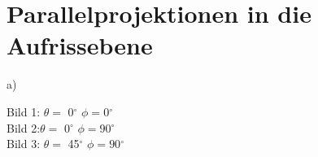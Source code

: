 
\setcounter{T-section}{2}
\renewcommand*\thesection{T\Nummerierung{\arabic{T-section}}}
\section{Parallelprojektionen in die Aufrissebene}

a)

Bild 1: \ensuremath{\theta =} 0$^{\circ}$ \; \ensuremath{\phi = 0}$^{\circ}$ \\
Bild 2:\ensuremath{\theta =} 0$^{\circ}$ \; \ensuremath{\phi = 90}$^{\circ}$ \\
Bild 3: \ensuremath{\theta =} 45$^{\circ}$ \; \ensuremath{\phi = 90}$^{\circ}$\\
